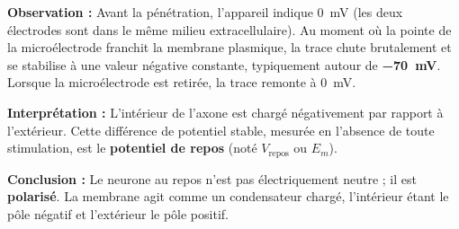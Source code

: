 \documentclass[11pt]{article}
\begin{document}
\begin{experience}
\textbf{Observation :} Avant la pénétration, l'appareil indique \SI{0}{mV} (les deux électrodes sont dans le même milieu extracellulaire). Au moment où la pointe de la microélectrode franchit la membrane plasmique, la trace chute brutalement et se stabilise à une valeur négative constante, typiquement autour de \textbf{\SI{-70}{mV}}. Lorsque la microélectrode est retirée, la trace remonte à \SI{0}{mV}.

\textbf{Interprétation :} L'intérieur de l'axone est chargé négativement par rapport à l'extérieur. Cette différence de potentiel stable, mesurée en l'absence de toute stimulation, est le \textbf{potentiel de repos} (noté $V_{\text{repos}}$ ou $E_m$).

\textbf{Conclusion :} Le neurone au repos n'est pas électriquement neutre ; il est \textbf{polarisé}. La membrane agit comme un condensateur chargé, l'intérieur étant le pôle négatif et l'extérieur le pôle positif.
\end{experience}
\end{document}

